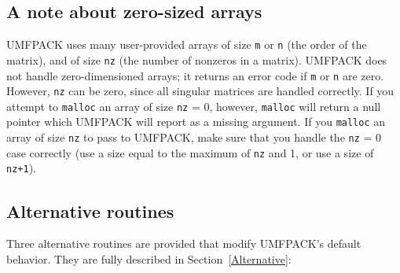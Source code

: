 \documentclass[11pt]{article}
\begin{document}
\subsection{A note about zero-sized arrays}

UMFPACK uses many user-provided arrays of
size {\tt m} or {\tt n} (the order of the matrix), and of size
{\tt nz} (the number of nonzeros in a matrix).  UMFPACK does not handle
zero-dimensioned arrays;
it returns an error code if {\tt m} or {\tt n}
are zero.  However, {\tt nz} can be zero, since all singular matrices are
handled correctly.  If you attempt to {\tt malloc} an array of size {\tt nz}
= 0, however, {\tt malloc} will return a null pointer which UMFPACK will report
as a missing argument.  If you {\tt malloc} an array of
size {\tt nz} to pass to UMFPACK, make sure that you handle the {\tt nz} = 0
case correctly (use a size equal to the maximum of {\tt nz} and 1, or use a
size of {\tt nz+1}).

\subsection{Alternative routines}

Three alternative routines are provided that modify UMFPACK's default
behavior.  They are fully described in Section~\ref{Alternative}:
\end{document}
